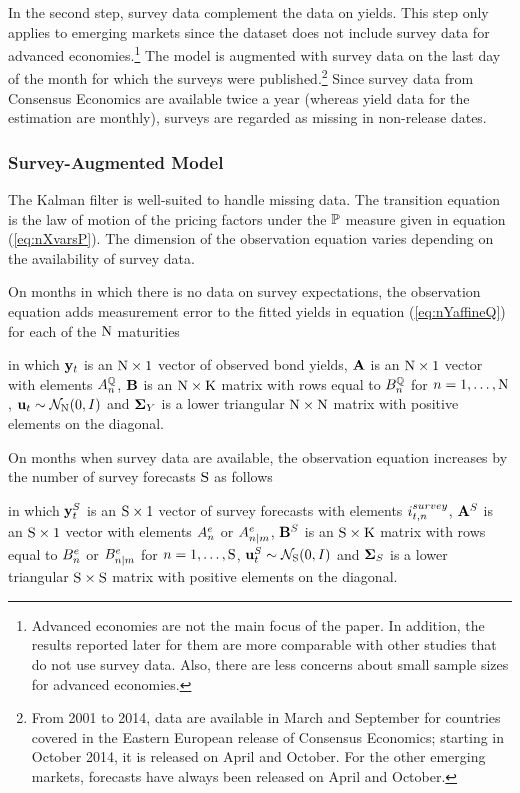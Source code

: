 {In the second step, survey data complement the data on yields. 
This step only applies to emerging markets since the dataset does not include survey data for advanced economies.\footnote{Advanced economies are not the main focus of the paper. In addition, the results reported later for them are more comparable with other studies that do not use survey data. Also, there are less concerns about small sample sizes for advanced economies.} 
The model is augmented with survey data on the last day of the month for which the surveys were published.\footnote{ From 2001 to 2014, data are available in March and September for countries covered in the Eastern European release of Consensus Economics; starting in October 2014, it is released on April and October. For the other emerging markets, forecasts have always been released on April and October.} 
Since survey data from Consensus Economics are available twice a year (whereas yield data for the estimation are monthly), surveys are regarded as missing in non-release dates. 


\subsubsection{Survey-Augmented Model} \label{sec:sATSM}
The Kalman filter is well-suited to handle missing data. 
The transition equation is the law of motion of the pricing factors under the \(\mathbb{P}\) measure given in equation (\ref{eq:nXvarsP}). 
The dimension of the observation equation varies depending on the availability of survey data. 

On months in which there is no data on survey expectations, the observation equation adds measurement error to the fitted yields in equation (\ref{eq:nYaffineQ}) for each of the \(\mathrm{N}\) maturities
	
\noindent in which \(\mathbf{y}_{t}\) is an \(\mathrm{N} \times 1\) vector of observed bond yields, \(\mathbf{A}\) is an \(\mathrm{N} \times 1\) vector with elements \(A_{n}^{\mathbb{Q}}\), \(\mathbf{B}\) is an \(\mathrm{N} \times \mathrm{K}\) matrix with rows equal to \(B_{n}^{\mathbb{Q}}\) for \(n = 1, \ldots, \mathrm{N}\), \(\mathbf{u}_{t} \sim \mathcal{N}_{\mathrm{N}} (0,I) \) and \(\mathbf{\mathbf{\Sigma}}_{Y}\) is a lower triangular \(\mathrm{N} \times \mathrm{N}\) matrix with positive elements on the diagonal.

On months when survey data are available, the observation equation increases by the number of survey forecasts \(\mathrm{S}\) as follows 
	
\noindent in which \(\mathbf{y}_{t}^{S}\) is an \(\mathrm{S} \times 1\) vector of survey forecasts with elements \(i_{t,n}^{survey}\), \(\mathbf{A}^{S}\) is an \(\mathrm{S} \times 1\) vector with elements \(A_{n}^{e}\) or \(A_{n | m}^{e}\), \(\mathbf{B}^{S}\) is an \(\mathrm{S} \times \mathrm{K}\) matrix with rows equal to \(B_{n}^{e}\) or \(B_{n | m}^{e}\) for \(n = 1, \ldots, \mathrm{S}\), \(\mathbf{u}_{t}^{S} \sim \mathcal{N}_{\mathrm{S}} (0,I) \) and \(\mathbf{\mathbf{\Sigma}}_{S}\) is a lower triangular \(\mathrm{S} \times \mathrm{S}\) matrix with positive elements on the diagonal.

}

